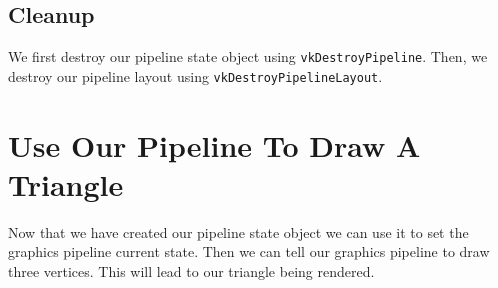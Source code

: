 \begin{minipage}{\linewidth}{\noindent}
    
\end{minipage}

\subsection{Cleanup}

We first destroy our pipeline state object using \texttt{vkDestroyPipeline}.
Then, we destroy our pipeline layout using \texttt{vkDestroyPipelineLayout}.

\section{Use Our Pipeline To Draw A Triangle}

Now that we have created our pipeline state object we can use it
to set the graphics pipeline current state.
Then we can tell our graphics pipeline to draw three vertices.
This will lead to our triangle being rendered.

\begin{minipage}{\linewidth}{\noindent}
    
\end{minipage}
